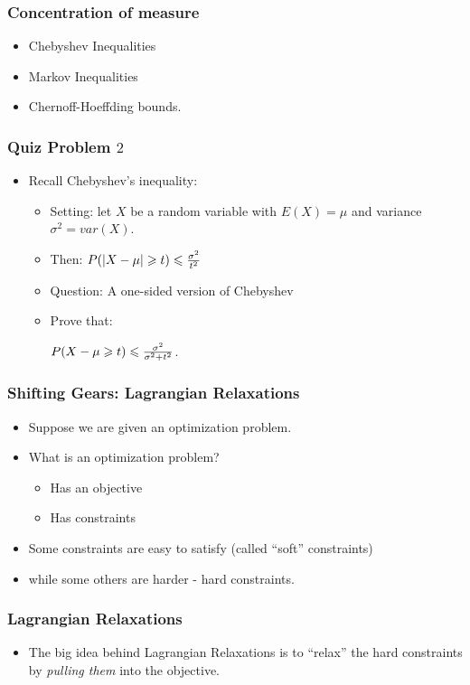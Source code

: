 \documentclass{beamer}
\begin{document}
\begin{frame}
\frametitle{Concentration of measure}
\begin{itemize}
\item Chebyshev Inequalities
\item Markov Inequalities
\item Chernoff-Hoeffding bounds.
\end{itemize}
\end{frame}

\begin{frame}
\frametitle{Quiz Problem $2$}
\begin{itemize}
\item Recall Chebyshev's inequality: 
\begin{itemize}
\item Setting: let $X$ be a random variable with $E(X)= \mu$ and variance $\sigma^2 = var(X)$. 
\item Then: $P( | X - \mu | \geqslant t ) \leqslant \frac{\sigma^2}{t^2}$
\pause
\item Question: A one-sided version of Chebyshev
\pause
\item Prove that: 
\begin{center}
{\color{red}
$P( X - \mu \geqslant t ) \leqslant \frac{\sigma^2}{\sigma^2 + t^2}$. 
}
\end{center}
\end{itemize}
\end{itemize}
\end{frame}

\begin{frame}
\frametitle{Shifting Gears: Lagrangian Relaxations}
\begin{itemize}
\item Suppose we are given an optimization problem. 
\item What is an optimization problem? 
\begin{itemize}
\item Has an {\color{red} objective}
\item Has {\color{blue} constraints}
\end{itemize}
\pause
\item Some constraints are easy to satisfy \pause (called ``soft'' constraints)
\pause 
\item while some others are harder - hard constraints. 
\end{itemize}
\end{frame}

\begin{frame}
\frametitle{Lagrangian Relaxations}
\begin{itemize}
\item The big idea behind Lagrangian Relaxations is to ``relax'' the hard constraints by
{\em pulling them} into the objective. 
\end{itemize}
\end{frame}
\end{document}
